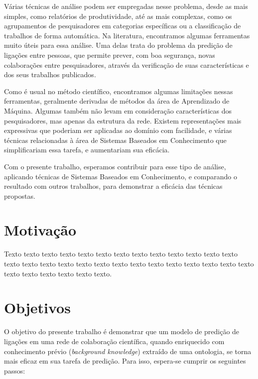 Várias técnicas de análise podem ser empregadas nesse problema, desde as mais simples, como relatórios de produtividade, até as mais complexas, como os agrupamentos de pesquisadores em categorias específicas ou a classificação de trabalhos de forma automática. Na literatura, encontramos algumas ferramentas muito úteis para essa análise. Uma delas trata do problema da predição de ligações entre pessoas, que permite prever, com boa segurança, novas colaborações entre pesquisadores, através da verificação de suas características e dos seus trabalhos publicados.

Como é usual no método científico, encontramos algumas limitações nessas ferramentas, geralmente derivadas de métodos da área de Aprendizado de Máquina. Algumas também não levam em consideração características dos pesquisadores, mas apenas da estrutura da rede. Existem representações mais expressivas que poderiam ser aplicadas ao domínio com facilidade, e várias técnicas relacionadas à área de Sistemas Baseados em Conhecimento que simplificariam essa tarefa, e aumentariam sua eficácia.


Com o presente trabalho, esperamos contribuir para esse tipo de análise, aplicando técnicas de Sistemas Baseados em Conhecimento, e comparando o resultado com outros trabalhos, para demonstrar a eficácia das técnicas propostas.

\section{Motivação}
\label{sec:motivacao}

Texto texto texto texto texto texto texto texto texto texto texto texto texto
texto texto texto texto texto texto texto texto texto texto texto texto texto
texto texto texto texto texto texto texto.


\section{Objetivos}
\label{sec:objetivos}

O objetivo do presente trabalho é demonstrar que um modelo de predição de ligações em uma rede de colaboração científica, quando enriquecido com conhecimento prévio (\textit{background knowledge}) extraído de uma ontologia, se torna mais eficaz em sua tarefa de predição.
Para isso, espera-se cumprir os seguintes passos:

